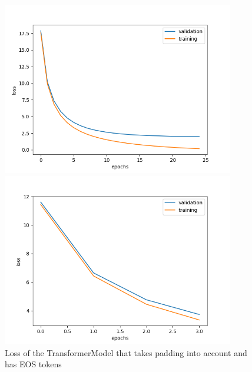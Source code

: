 \documentclass{article}
\begin{document}
\begin{figure}[h]
    \centering
    \begin{minipage}{0.45\textwidth}
        \includegraphics[width=0.9\textwidth]{transformer.png}
        \caption{%
            Loss of the standard TransformerModel
        }\label{fig:transformer}
    \end{minipage}
    \begin{minipage}{0.45\textwidth}
        \includegraphics[width=0.9\textwidth]{transformer_padding-eos.png}
        \caption{%
            Loss of the TransformerModel that takes padding into account and has EOS tokens
        }\label{fig:transformerPaddingEOS}
    \end{minipage}
\end{figure}


%
\end{document}
